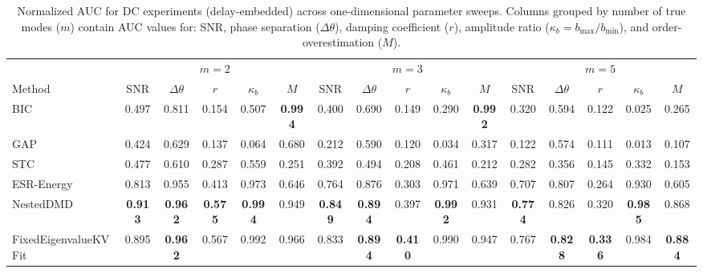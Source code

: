 \begin{table}[t]
\centering
\small
\setlength{\tabcolsep}{3pt}
\begin{tabular}{lccccccccccccccc}
\hline
 & \multicolumn{5}{c}{$m = 2$} & \multicolumn{5}{c}{$m = 3$} & \multicolumn{5}{c}{$m = 5$} \\
Method & SNR & $\Delta\theta$ & $r$ & $\kappa_b$ & $M$ & SNR & $\Delta\theta$ & $r$ & $\kappa_b$ & $M$ & SNR & $\Delta\theta$ & $r$ & $\kappa_b$ & $M$ \\
\hline
BIC & 0.497 & 0.811 & 0.154 & 0.507 & \textbf{0.994} & 0.400 & 0.690 & 0.149 & 0.290 & \textbf{0.992} & 0.320 & 0.594 & 0.122 & 0.025 & 0.265 \\
GAP & 0.424 & 0.629 & 0.137 & 0.064 & 0.680 & 0.212 & 0.590 & 0.120 & 0.034 & 0.317 & 0.122 & 0.574 & 0.111 & 0.013 & 0.107 \\
STC & 0.477 & 0.610 & 0.287 & 0.559 & 0.251 & 0.392 & 0.494 & 0.208 & 0.461 & 0.212 & 0.282 & 0.356 & 0.145 & 0.332 & 0.153 \\
ESR-Energy & 0.813 & 0.955 & 0.413 & 0.973 & 0.646 & 0.764 & 0.876 & 0.303 & 0.971 & 0.639 & 0.707 & 0.807 & 0.264 & 0.930 & 0.605 \\
NestedDMD & \textbf{0.913} & \textbf{0.962} & \textbf{0.575} & \textbf{0.994} & 0.949 & \textbf{0.849} & \textbf{0.894} & 0.397 & \textbf{0.992} & 0.931 & \textbf{0.774} & 0.826 & 0.320 & \textbf{0.985} & 0.868 \\
FixedEigenvalueKVFit & 0.895 & \textbf{0.962} & 0.567 & 0.992 & 0.966 & 0.833 & \textbf{0.894} & \textbf{0.410} & 0.990 & 0.947 & 0.767 & \textbf{0.828} & \textbf{0.336} & 0.984 & \textbf{0.884} \\
\hline
\end{tabular}
\caption{Normalized AUC for DC experiments (delay-embedded) across one-dimensional parameter sweeps. Columns grouped by number of true modes ($m$) contain AUC values for: SNR, phase separation ($\Delta\theta$), damping coefficient ($r$), amplitude ratio ($\kappa_b = b_{\max}/b_{\min}$), and order-overestimation ($M$).}
\label{tab:auc_dc}
\end{table}
